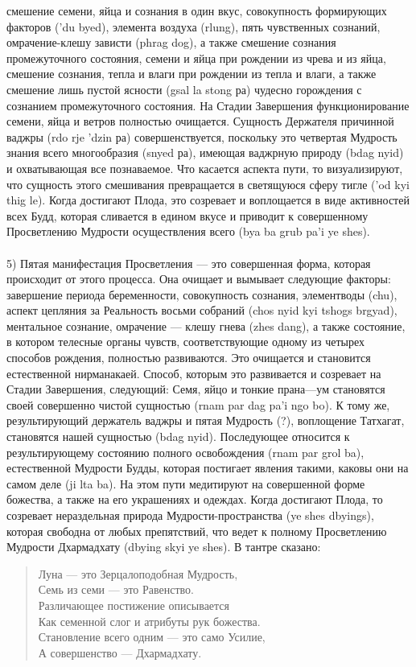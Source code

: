 смешение семени, яйца и сознания в один вкус, совокупность формирующих факторов ('du
byed), элемента воздуха (rlung), пять чувственных сознаний, омрачение-клешу зависти (phrag
dog), а также смешение сознания промежуточного состояния, семени и яйца при рождении
из чрева и из яйца, смешение сознания, тепла и влаги при рождении из тепла и влаги, а также
смешение лишь пустой ясности (gsal la stong ра) чудесно горождения с сознанием
промежуточного состояния. На Стадии Завершения функционирование семени, яйца и
ветров полностью очищается. Сущность Держателя причинной ваджры (rdo rje 'dzin ра)
совершенствуется, поскольку это четвертая Мудрость знания всего многообразия (snyed
ра), имеющая ваджрную природу (bdag nyid) и охватывающая все познаваемое. Что касается
аспекта пути, то визуализируют, что сущность этого смешивания превращается в
светящуюся сферу тигле ('od kyi thig le). Когда достигают Плода, это созревает и
воплощается в виде активностей всех Будд, которая сливается в едином вкусе и приводит к
совершенному Просветлению Мудрости осуществления всего (bya ba grub pa'i ye shes).\\
\\
5) Пятая манифестация Просветления — это совершенная форма, которая
происходит от этого процесса. Она очищает и вымывает следующие факторы: завершение
периода беремен\-ности, совокупность сознания, элементводы (chu), аспект цепляния за
Реальность восьми собраний (chos nyid kyi tshogs brgyad), ментальное сознание, омрачение —
клешу гнева (zhes dang), а также состояние, в котором телесные органы чувств,
соответствующие одному из четырех способов рождения, полностью развиваются. Это
очищается и становится естествен\-ной нирманакаей. Способ, которым это развивается и
созревает на Стадии Завершения, следующий: Семя, яйцо и тонкие прана—ум становятся
своей совершенно чистой сущностью (rnam par dag pa'i ngo bo). К тому же, результирую\-щий
держатель ваджры и пятая Мудрость (?), воплощение Татхагат, становятся нашей сущностью
(bdag nyid). Последую\-щее относится к результирующему состоянию полного освобож\-дения
(rnam par grol ba), естественной Мудрости Будды, которая постигает явления такими, каковы
они на самом деле (ji lta ba). На этом пути медитируют на совершенной форме божества, а
также на его украшениях и одеждах. Когда достигают Плода, то созревает нераздельная
природа Мудрости-пространства (ye shes dbyings), которая свободна от любых препятствий,
что ведет к полному Просветлению Мудрости Дхармадхату (dbying skyi ye shes). В тантре
сказано:
\begin{verse}
Луна — это Зерцалоподобная Мудрость,\\
Семь из семи — это Равенство.\\
Различающее постижение описывается\\
Как семенной слог и атрибуты рук божества.\\
Становление всего одним — это само Усилие,\\
А совершенство — Дхармадхату.
\end{verse}
